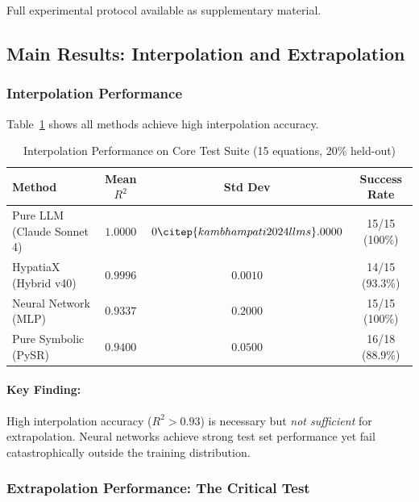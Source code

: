 \documentclass[twoside,11pt]{article}
\begin{document}
Full experimental protocol available as supplementary material.


\subsection{Main Results: Interpolation and Extrapolation}

\subsubsection{Interpolation Performance}

Table~\ref{tab:interpolation_results} shows all methods achieve high interpolation accuracy.

\begin{table}[htbp]
\centering
\caption{Interpolation Performance on Core Test Suite (15 equations, 20\% held-out)}
\label{tab:interpolation_results}
\begin{tabular}{lccc}
\toprule
\textbf{Method} & \textbf{Mean $R^2$} & \textbf{Std Dev} & \textbf{Success Rate} \\
\midrule
Pure LLM (Claude Sonnet 4) & $1.0000$ & $0\citep{kambhampati2024llms}.0000$ & 15/15 (100\%) \\
HypatiaX (Hybrid v40) & $0.9996$ & $0.0010$ & 14/15 (93.3\%) \\
Neural Network (MLP) & $0.9337$ & $0.2000$ & 15/15 (100\%) \\
Pure Symbolic (PySR) & $0.9400$ & $0.0500$ & 16/18 (88.9\%) \\
\bottomrule
\end{tabular}
\end{table}

\paragraph{Key Finding:} High interpolation accuracy ($R^2 > 0.93$) is necessary but \emph{not sufficient} for extrapolation. Neural networks achieve strong test set performance yet fail catastrophically outside the training distribution\citep{liu2020understanding}\citep{zhou2020universality}.

\subsubsection{Extrapolation Performance: The Critical Test}
\end{document}
